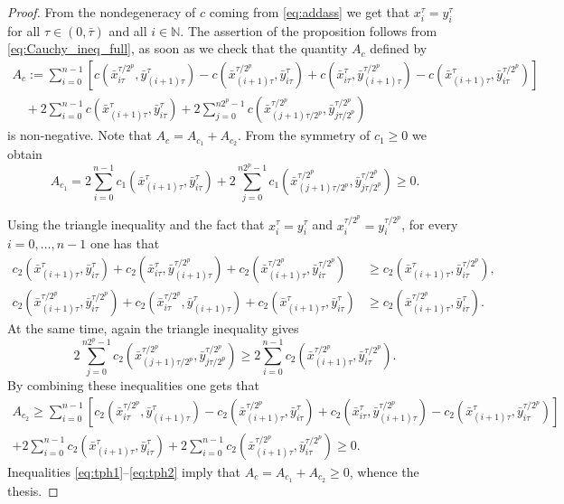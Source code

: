\documentclass[reqno]{amsart}
\theoremstyle{plain}
\theoremstyle{remark}
\theoremstyle{plain}
\numberwithin{equation}{section}
\theoremstyle{remark}
\newcommand{\N}{\mathbb{N}}
\begin{document}
\begin{proof}  From the nondegeneracy of $c$  coming from \eqref{eq:addass}  we get that $x_i^\tau=y_i^\tau$ for all $\tau \in (0,\bar{\tau})$ and all $i \in \N$. 
The assertion of the proposition follows from \eqref{eq:Cauchy_ineq_full}, as soon as we check that the quantity $A_c$  defined by 
\begin{multline}
    A_c:= \sum_{i=0}^{n-1}[c(\bar{x}_{i\tau}^{\tau/2^p},\bar{y}_{(i+1)\tau}^\tau)- c(\bar{x}_{(i+1)\tau}^{\tau/2^p},\bar{y}_{i\tau}^\tau) + c(\bar{x}_{i\tau}^\tau,\bar{y}_{(i+1)\tau}^{\tau/2^p})-c(\bar{x}_{(i+1)\tau}^\tau,\bar{y}_{i\tau}^{\tau/2^p})]\\
   \quad +2\sum_{i=0}^{n-1}c(\bar{x}_{(i+1)\tau}^\tau, \bar{y}_{i\tau}^\tau)+ 2\sum_{j=0}^{n2^p-1}c(\bar{x}_{(j+1)\tau/2^p}^{\tau/2^p}, \bar{y}_{j\tau/2^p}^{\tau/2^p})\label{eq:tph0}
\end{multline}
 is non-negative. 
Note that $A_c=A_{c_1}+A_{c_2}$. From the symmetry of $c_1\geq 0$ we obtain 
\begin{equation}
      A_{c_1}=2\sum_{i=0}^{n-1}c_1(\bar{x}_{(i+1)\tau}^\tau, \bar{y}_{i\tau}^\tau)+ 2\sum_{j=0}^{n2^p-1}c_1(\bar{x}_{(j+1)\tau/2^p}^{\tau/2^p}, \bar{y}_{j\tau/2^p}^{\tau/2^p}) \ge 0.\label{eq:tph1}
\end{equation}

Using the triangle inequality and the fact that $x_i^\tau = y_i^\tau $ and $x_i^{\tau/2^p} = y_i^{\tau/2^p} $, for  every $i=0, \dots, n-1$ one has that 
\begin{align*}
   c_2(\bar{x}_{(i+1)\tau}^\tau, \bar y_{i\tau}^\tau)+ c_2(\bar x_{i\tau}^\tau,\bar y_{(i+1)\tau}^{\tau/2^p})+c_2(\bar x_{(i+1)\tau}^{\tau/2^p}, \bar y_{i\tau}^{\tau/2^p}) &\ge c_2(\bar x_{(i+1)\tau}^\tau,\bar y_{i\tau}^{\tau/2^p}),\\
   c_2(\bar x_{(i+1)\tau}^{\tau/2^p}, \bar y_{i\tau}^{\tau/2^p})+c_2(\bar x_{i\tau}^{\tau/2^p},\bar y_{(i+1)\tau}^\tau) + c_2(\bar x_{(i+1)\tau}^\tau, \bar y_{i\tau}^\tau) &\ge c_2(\bar x_{(i+1)\tau}^{\tau/2^p},\bar y_{i\tau}^\tau).
\end{align*}
At the same time, again the triangle inequality gives 
\begin{equation*}
    2  \sum_{j=0}^{n2^p-1}c_2(\bar x_{(j+1)\tau/2^p}^{\tau/2^p}, \bar y_{j\tau/2^p}^{\tau/2^p}) \ge   2  \sum_{i=0}^{n-1}c_2(\bar x_{(i+1)\tau}^{\tau/2^p}, \bar y_{i\tau}^{\tau/2^p}).
\end{equation*}
By combining these inequalities one gets that 
\begin{multline}
   A_{c_2}\geq 
   \sum_{i=0}^{n-1}[c_2(\bar{x}_{i\tau}^{\tau/2^p},\bar{y}_{(i+1)\tau}^\tau)- c_2(\bar{x}_{(i+1)\tau}^{\tau/2^p},\bar{y}_{i\tau}^\tau) + c_2(\bar{x}_{i\tau}^\tau,\bar{y}_{(i+1)\tau}^{\tau/2^p})-c_2(\bar{x}_{(i+1)\tau}^\tau,\bar{y}_{i\tau}^{\tau/2^p})]\\
   +2\sum_{i=0}^{n-1}c_2(\bar{x}_{(i+1)\tau}^\tau, \bar{y}_{i\tau}^\tau)+ 2\sum_{i=0}^{n-1}c_2(\bar x_{(i+1)\tau}^{\tau/2^p}, \bar y_{i\tau}^{\tau/2^p}) \geq 0. 
   \label{eq:tph2}
\end{multline}
Inequalities \eqref{eq:tph1}--\eqref{eq:tph2} imply  that $A_c = A_{c_1} + A_{c_2} \geq 0$,  whence the thesis. 
\end{proof}
\end{document}
